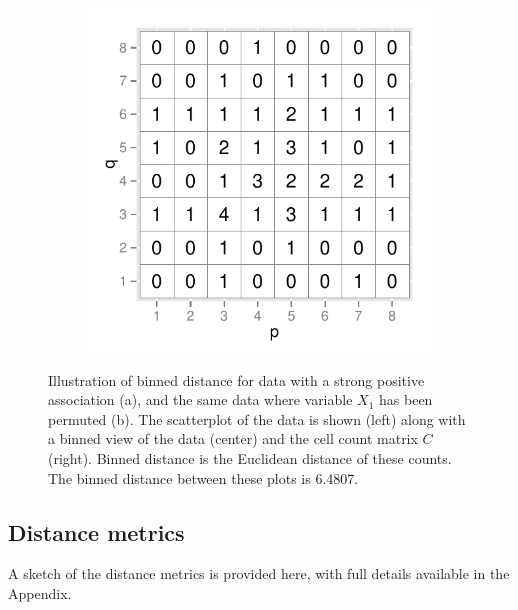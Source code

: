 \documentclass[12pt]{article}\usepackage[]{graphicx}\usepackage[]{color}
\begin{document}
\begin{figure}[!t]
\begin{subfigure}[t]{\textwidth}
\includegraphics[scale=0.55]{freq-example-2.pdf}
\end{subfigure}
\label{first-example}
	\vspace{-.1in}
       \caption{Illustration of binned distance for data with a strong positive association (a), and the same data where variable $X_1$ has been permuted (b). The scatterplot of the data is shown (left) along with a binned view of the data (center) and the cell count matrix $C$ (right). Binned distance is the Euclidean distance of these counts. The binned distance between these plots is 6.4807. }
\label{first-example}
\end{figure}

\subsection{Distance metrics}\label{sec:distmet}

A sketch of the distance metrics is provided here, with full details available in the Appendix.
\end{document}
